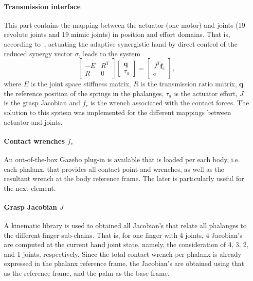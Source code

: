 \paragraph{Transmission interface} This part contains the mapping between the actuator (one motor) and joints (19 revolute joints and 19 mimic joints) in position and effort domains. That is, according to~\cite{Catalano2014Adaptive}, actuating the adaptive synergistic hand by direct control of the reduced synergy vector $\sigma$, leads to the system
\begin{equation}
\left[ \begin{array}{cc} -E & R^{T} \\ R & 0 \end{array} \right] \left[ \begin{array}{c} \mathbf{q} \\ \tau_{a}  \end{array} \right] = \left[ \begin{array}{c} J^{T}\mathbf{f}_{c} \\ \sigma  \end{array} \right],
\end{equation}
where $E$ is the joint space stiffness matrix, $R$ is the transmission ratio matrix, $\mathbf{q}$ the reference position of the springs in the phalanges, $\tau_{a}$ is the actuator effort, $J$ is the grasp Jacobian and $f_c$ is the wrench associated with the contact forces. The solution to this system was implemented for the different mappings between actuator and joints.

\paragraph{Contact wrenches $f_c$} An out-of-the-box Gazebo plug-in is available that is loaded per each body, i.e. each phalanx, that provides all contact point and wrenches, as well as the resultant wrench at the body reference frame. The later is particularly useful for the next element.

\paragraph{Grasp Jacobian $J$} A kinematic library is used to obtained all Jacobian's that relate all phalanges to the different finger sub-chains. That is, for one finger with 4 joints, 4 Jacobian's are computed at the current hand joint state, namely, the consideration of 4, 3, 2, and 1 joints, respectively. Since the total contact wrench per phalanx is already expressed in the phalanx reference frame, the Jacobian's are obtained using that as the reference frame, and the palm as the base frame. 

